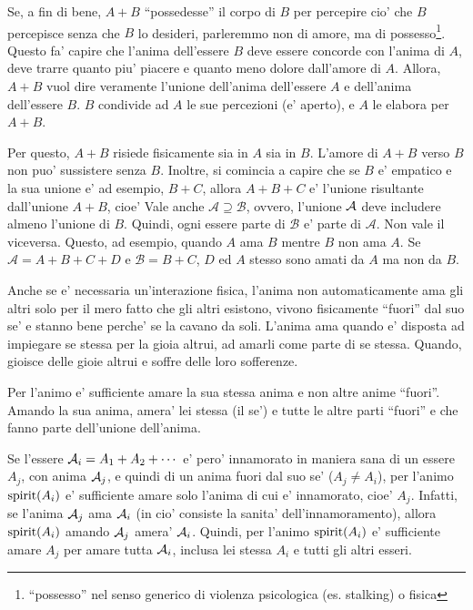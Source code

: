 Se, a fin di bene, $A+B$ ``possedesse'' il corpo di $B$ per percepire cio' che $B$ percepisce senza che $B$ lo desideri, parleremmo non di amore, ma di possesso\footnote{``possesso'' nel senso generico di violenza psicologica (es. stalking) o fisica}. Questo fa' capire che l'anima dell'essere $B$ deve essere concorde con l'anima di $A$, deve trarre quanto piu' piacere e quanto meno dolore dall'amore di $A$. Allora, $A+B$ vuol dire veramente l'unione dell'anima dell'essere $A$ e dell'anima dell'essere $B$. $B$ condivide ad $A$ le sue percezioni (e' aperto), e $A$ le elabora per $A+B$. 

Per questo, $A+B$ risiede fisicamente sia in $A$ sia in $B$. L'amore di $A+B$ verso $B$ non puo' sussistere senza $B$. Inoltre, si comincia a capire che se $B$ e' empatico e la sua unione e' ad esempio, $B+C$, allora $A+B+C$ e' l'unione risultante dall'unione $A+B$, cioe'
Vale anche $\mathcal{A} \supseteq \mathcal{B}$, ovvero, l'unione $\mathcal{A}$ deve includere almeno l'unione di $B$. Quindi, ogni essere parte di $\mathcal{B}$ e' parte di $\mathcal{A}$. Non vale il viceversa. Questo, ad esempio, quando $A$ ama $B$ mentre $B$ non ama $A$. Se $\mathcal{A}=A+B+C+D$ e $\mathcal{B}=B+C$, $D$ ed $A$ stesso sono amati da $A$ ma non da $B$.

Anche se e' necessaria un'interazione fisica, l'anima non automaticamente ama gli altri solo per il mero fatto che gli altri esistono, vivono fisicamente ``fuori'' dal suo se' e stanno bene perche' se la cavano da soli. L'anima ama quando e' disposta ad impiegare se stessa per la gioia altrui, ad amarli come parte di se stessa. Quando, gioisce delle gioie altrui e soffre delle loro sofferenze. 

Per l'animo e' sufficiente amare la sua stessa anima e non altre anime ``fuori''. Amando la sua anima, amera' lei stessa (il se') e tutte le altre parti ``fuori'' e che fanno parte dell'unione dell'anima.

Se l'essere $\mathcal{A}_i=A_1+A_2+\cdots$ e' pero' innamorato in maniera sana di un essere $A_j$, con anima $\mathcal{A}_j$, e quindi di un anima fuori dal suo se' ($A_j\ne A_i$), per l'animo $\textrm{spirit}(A_i)$ e' sufficiente amare solo l'anima di cui e' innamorato, cioe' $A_j$. Infatti, se l'anima $\mathcal{A}_j$ ama $\mathcal{A}_i$ (in cio' consiste la sanita' dell'innamoramento), allora $\textrm{spirit}(A_i)$ amando $\mathcal{A}_j$ amera' $\mathcal{A}_i$.
Quindi, per l'animo $\textrm{spirit}(A_i)$ e' sufficiente amare $A_j$ per amare tutta $\mathcal{A}_i$, inclusa lei stessa $A_i$ e tutti gli altri esseri.

